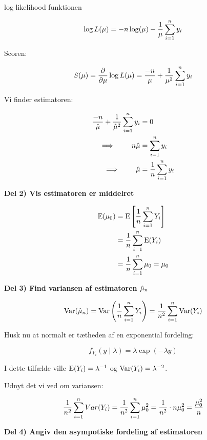 log likelihood funktionen

\begin{equation}
    \log L (\mu) = -n\log(\mu) - \frac{1}{\mu}\sum_{i=1}^{n} y_i
\end{equation}

Scoren:

\begin{equation}
    S(\mu) = \frac{\partial}{\partial \mu} \log L (\mu) = \frac{-n}{\mu} + \frac{1}{\mu^2} \sum_{i=1}^{n} y_i
\end{equation}

Vi finder estimatoren:

\begin{align}
    \frac{-n}{\hat{\mu}} + \frac{1}{\hat{\mu}^2} \sum_{i=1}^{n} y_i &= 0 \\ \implies \qquad n \hat{\mu} &= \sum_{i=1}^{n} y_i
    \\
    \implies  \qquad \hat{\mu} &= \frac{1}{n}\sum_{i=1}^{n} y_i
\end{align}

\textbf{Del 2) Vis estimatoren er middelret}

\begin{align}
    \text{E}(\mu_0) &= \text{E} \left[ \frac{1}{n}\sum_{i=1}^{n} Y_i \right] \\
    &= \frac{1}{n} \sum_{i=1}^{n} \text{E} (Y_i) \\
    &= \frac{1}{n} \sum_{i=1}^{n} \mu_0 = \mu_0
\end{align}

\textbf{Del 3) Find variansen af estimatoren $\hat{\mu}_n$}

\begin{equation}
    \text{Var}(\hat{\mu}_n) = \text{Var} \left( \frac{1}{n}\sum_{i=1}^{n} Y_i \right) = \frac{1}{n^2} \sum_{i=1}^{n} \text{Var}(Y_i)
\end{equation}

Husk nu at normalt er tætheden af en exponential fordeling:

\begin{equation}
    f_{Y_i}(y \mid \lambda) = \lambda \exp (-\lambda y)
\end{equation}


I dette tilfælde ville $\text{E}(Y_i) = \lambda^{-1}$ og $\text{Var}(Y_i) = \lambda^{-2}$.

Udnyt det vi ved om variansen:

\begin{equation}
    \frac{1}{n^2} \sum_{i=1}^{n} Var(Y_i) = \frac{1}{n^2} \sum_{i=1}^{n} \mu_0^2 = \frac{1}{n^2} \cdot n \mu_0^2 = \frac{\mu_0^2}{n}
\end{equation}


\textbf{Del 4) Angiv den asympotiske fordeling af estimatoren}

